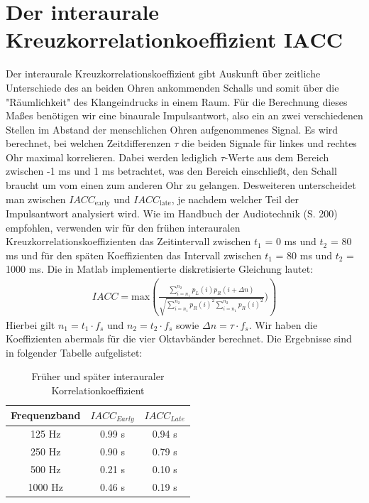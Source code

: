 \section{Der interaurale Kreuzkorrelationkoeffizient $\mathbf{IACC}$}
\label{sec:iacc}

Der interaurale Kreuzkorrelationskoeffizient gibt Auskunft über zeitliche Unterschiede des an beiden Ohren ankommenden Schalls und somit über die "Räumlichkeit" des Klangeindrucks in einem Raum. 
Für die Berechnung dieses Maßes benötigen wir eine binaurale Impulsantwort, also ein an zwei verschiedenen Stellen im Abstand der menschlichen Ohren aufgenommenes Signal. 
Es wird berechnet, bei welchen Zeitdifferenzen $\tau$ die beiden Signale für linkes und rechtes Ohr maximal korrelieren.
Dabei werden lediglich $\tau$-Werte aus dem Bereich zwischen -1 ms und 1 ms betrachtet, was den Bereich einschließt, den Schall braucht um vom einen zum anderen Ohr zu gelangen.  
Desweiteren unterscheidet man zwischen $IACC_{\mathrm{early}}$ und $IACC_{\mathrm{late}}$, je nachdem welcher Teil der Impulsantwort analysiert wird. Wie im Handbuch der Audiotechnik \cite{Weinzierl08} (S. 200) empfohlen, verwenden wir für den frühen interauralen Kreuzkorrelationskoeffizienten das Zeitintervall zwischen $t_1$ = 0 ms und $t_2$ = 80 ms und für den späten Koeffizienten das Intervall zwischen $t_1$ = 80 ms und $t_2$ = 1000 ms. 
Die in Matlab implementierte diskretisierte Gleichung lautet:
\begin{align*}
IACC = \mathrm{max}\left( \frac{\sum_{i=n_1}^{n_2} p_L(i)p_R(i+\Delta n)} {\sqrt{\sum_{i=n_1}^{n_2}p_R(i)^2 \sum_{i=n_1}^{n_2} p_R(i)^2 }})\right) 
\end{align*}
Hierbei gilt $n_1 = t_1 \cdot f_s$ und  $n_2 = t_2 \cdot f_s$ sowie $\Delta n = \tau \cdot f_s$.
Wir haben die Koeffizienten abermals für die vier Oktavbänder berechnet.
Die Ergebnisse sind in folgender Tabelle aufgelistet:
\begin{table}[H]
    \centering
    \caption{Früher und später interauraler Korrelationkoeffizient}
    \label{tab:iacc}
    \begin{tabular}[\textwidth]{|c|c|c|}
    \hline
        Frequenzband & $IACC_{Early}$ &$IACC_{Late}$ \\
        \hline
        125 Hz & 0.99 s & 0.94 s \\
        250 Hz & 0.90 s & 0.79 s \\
        500 Hz & 0.21 s & 0.10 s \\
        1000 Hz & 0.46 s & 0.19 s \\
        \hline
    \end{tabular}
\end{table}

